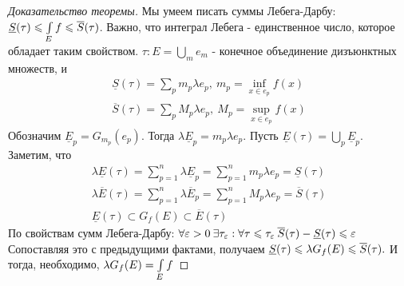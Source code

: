 \begin{proof}[Доказательство теоремы]
	Мы умеем писать суммы Лебега-Дарбу: $\underline{S}(\tau) \leqslant \int\limits_{E} f \leqslant \overline{S}(\tau)$. 
	Важно, что интеграл Лебега - единственное число, которое обладает таким свойством. $\tau : E = \bigcup\limits_{m} e_m$ - конечное объединение дизъюнктных множеств, и	
	\begin{gather*}
		\underline{S}(\tau) = \sum\limits_{p} m_p \lambda e_p, \:m_p = \inf\limits_{x \in e_p} f(x) \\
		\overline{S}(\tau) = \sum\limits_{p} M_p \lambda e_p, \:M_p = \sup\limits_{x \in e_p} f(x)
	\end{gather*}
	Обозначим $\underline{E}_p = G_{m_p}(e_p)$. Тогда $\lambda \underline{E}_p = m_p \lambda e_p$. Пусть $\underline{E}(\tau) = \bigcup\limits_{p}\underline{E}_p$.
	Заметим, что 
	\begin{gather*}
		\lambda\underline{E}(\tau) = \sum\limits_{p = 1}^{n}\lambda\underline{E}_p = \sum\limits_{p = 1}^{n} m_p \lambda e_p = \underline{S}(\tau) \\
		\lambda\overline{E}(\tau) = \sum\limits_{p = 1}^{n}\lambda\overline{E}_p = \sum\limits_{p = 1}^{n} M_p \lambda e_p = \overline{S}(\tau) \\
		\underline{E}(\tau) \subset G_f(E) \subset \overline{E}(\tau)
	\end{gather*}
	По свойствам сумм Лебега-Дарбу: $\forall\varepsilon > 0\:\exists \tau_{\varepsilon}: \forall \tau \leqslant \tau_{\varepsilon}\: 
	\overline{S}(\tau) - \underline{S}(\tau) \leqslant \varepsilon \\$
	Сопоставляя это с предыдущими фактами, получаем $\underline{S}(\tau) \leqslant \lambda G_f(E) \leqslant \overline{S}(\tau).\\$
	И тогда, необходимо, $\lambda G_f(E) = \int\limits_{E} f$
 
\end{proof}

\newpage

